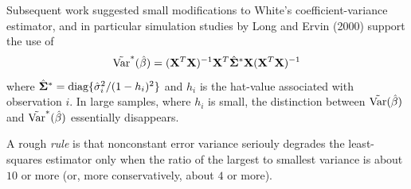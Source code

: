 Subsequent work suggested small modifications to White's coefficient-variance estimator, and in particular simulation studies by Long and Ervin (2000) support the use of 
$$
\tilde{\rm Var}^*(\hat{\mathbf{\beta}}) = (\mathbf{X}^T \mathbf{X})^{-1} \mathbf{X}^T \hat{\mathbf{\Sigma}}^* \mathbf{X} (\mathbf{X}^T \mathbf{X})^{-1}
$$
where $\hat{\mathbf{\Sigma}}^* = \mbox{diag}\{\hat{\sigma}_i^2/(1 - h_i)^2\}$ and $h_i$ is the hat-value associated with observation $i$.
In large samples, where $h_i$ is small, the distinction between $\tilde{\rm Var}(\hat{\mathbf{\beta}})$ and $\tilde{\rm Var}^*(\hat{\mathbf{\beta}})$ essentially disappears.

A rough {\it rule} is that nonconstant error variance seriouly degrades the least-squares estimator only when the ratio of the largest to smallest variance is about $10$ or more (or, more conservatively, about $4$ or more).




%
%



















